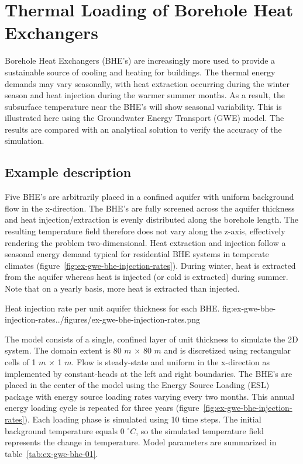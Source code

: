 \section{Thermal Loading of Borehole Heat Exchangers}

Borehole Heat Exchangers (BHE's) are increasingly more used to provide a sustainable source of cooling and heating for buildings. The thermal energy demands may vary seasonally, with heat extraction occurring during the winter season and heat injection during the warmer summer months. As a result, the subsurface temperature near the BHE's will show seasonal variability. This is illustrated here using the Groundwater Energy Transport (GWE) model. The results are compared with an analytical solution to verify the accuracy of the \mf simulation. 

\subsection{Example description}

Five BHE's are arbitrarily placed in a confined aquifer with uniform background flow in the x-direction. The BHE's are fully screened across the aquifer thickness and heat injection/extraction is evenly distributed along the borehole length. The resulting temperature field therefore does not vary along the z-axis, effectively rendering the problem two-dimensional. Heat extraction and injection follow a seasonal energy demand typical for residential BHE systems in temperate climates (figure~\ref{fig:ex-gwe-bhe-injection-rates}). During winter, heat is extracted from the aquifer whereas heat is injected (or cold is extracted) during summer. Note that on a yearly basis, more heat is extracted than injected.

\begin{StandardFigure}{
    Heat injection rate per unit aquifer thickness for each BHE.
    }{fig:ex-gwe-bhe-injection-rates}{../figures/ex-gwe-bhe-injection-rates.png}
\end{StandardFigure}                                 

The \mf model consists of a single, confined layer of unit thickness to simulate the 2D system. The domain extent is 80 $m$ $\times$ 80 $m$ and is discretized using rectangular cells of 1 $m$ $\times$ 1 $m$. Flow is steady-state and uniform in the x-direction as implemented by constant-heads at the left and right boundaries. The BHE's are placed in the center of the model using the Energy Source Loading (ESL) package with energy source loading rates varying every two months. This annual energy loading cycle is repeated for three years (figure~\ref{fig:ex-gwe-bhe-injection-rates}). Each loading phase is simulated using 10 time steps. The initial background temperature equals 0 $^{\circ} C$, so the simulated temperature field represents the change in temperature. Model parameters are summarized in table~\ref{tab:ex-gwe-bhe-01}.

